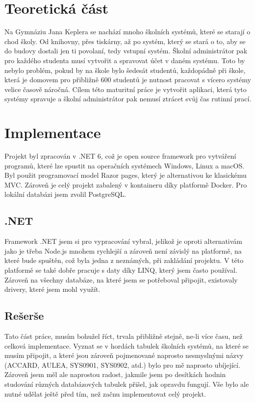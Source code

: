 \documentclass[11pt,a4paper,twoside,openright]{report}
\begin{document}


\setcounter{tocdepth}{2}
\tableofcontents

\chapter{Teoretická část}
\pagestyle{fancy}

Na Gymnáziu Jana Keplera se nachází mnoho školních systémů, které se starají o chod školy. Od knihovny, přes tiskárny, až po systém, který se stará o to, aby se do budovy dostali jen ti povolaní, tedy vstupní systém. Školní administrátor pak pro každého studenta musí vytvořit a spravovat účet v daném systému. Toto by nebylo problém, pokud by na škole bylo šedesát studentů, každopádně při škole, která je domovem pro přibližně 600 studentů je nutnost pracovat s vícero systémy velice časově náročná. Cílem této maturitní práce je vytvořit aplikaci, která tyto systémy spravuje a školní administrátor pak nemusí ztrácet svůj čas rutinní prací.


\chapter{Implementace}

Projekt byl zpracován v .NET 6, což je open source framework pro vytváření programů, které lze spustit na operačních systémech Windows, Linux a macOS. Byl použit programovací model Razor pages, který je alternativou ke klasickému MVC. Zároveň je celý projekt zabalený v kontaineru díky platformě Docker. Pro lokální databázi jsem zvolil PostgreSQL.

\section{.NET}
Framework .NET jsem si pro vypracování vybral, jelikož je oproti alternativám jako je třeba Node.js mnohem rychlejší a zároveň není závislý na platformě, na které bude spuštěn, což byla jedna z neznámých, při zakládání projektu. V této platformě se také dobře pracuje s daty díky LINQ, který jsem často používal. Zároveň na všechny databáze, na které jsem se potřeboval připojit, existovaly drivery, které jsem mohl využít. 
\section{Rešerše}
Tato část práce, musím bohužel říct, trvala přibližně stejně, ne-li více času, než celková implementace. Vyznat se v hordách tabulek školních systémů, na které se musím připojit, a které jsou zároveň pojmenované naprosto nesmyslnými názvy (ACCARD, AULEA, SYS0901, SYS0902, atd.) bylo pro mě naprosto ubíjející. Zároveň jsem měl ale naprostou radost, jakmile jsem po desítkách hodnin studování různých databázových tabulek přišel, jak opravdu fungují. Vše bylo ale nutné udělat ještě před tím, než začnu implementovat celý projekt.
\end{document}
